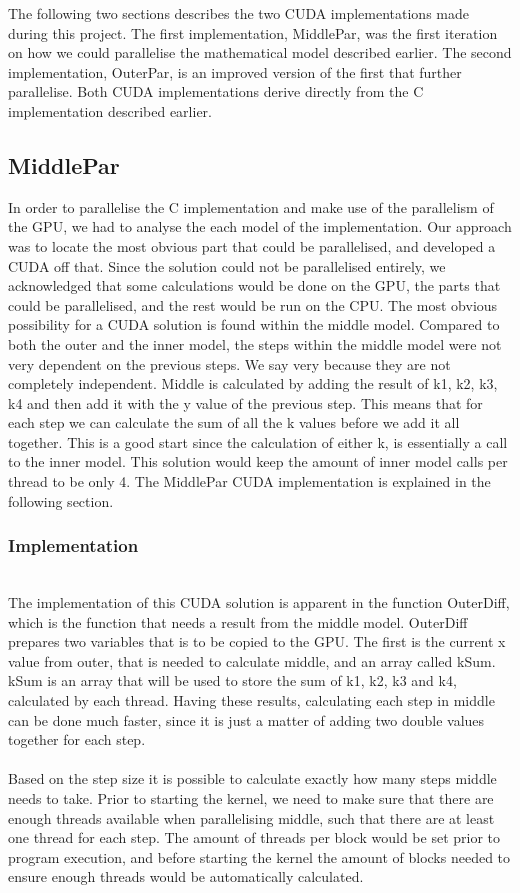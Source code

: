 The following two sections describes the two CUDA implementations made during this project. The first implementation, MiddlePar, was the first iteration on how we could parallelise the mathematical model described earlier. The second implementation, OuterPar, is an improved version of the first that further parallelise. Both CUDA implementations derive directly from the C implementation described earlier.

\subsection{MiddlePar}
In order to parallelise the C implementation and make use of the parallelism of the GPU, we had to analyse the each model of the implementation. Our approach was to locate the most obvious part that could be parallelised, and developed a CUDA off that. Since the solution could not be parallelised entirely, we acknowledged that some calculations would be done on the GPU, the parts that could be parallelised, and the rest would be run on the CPU. The most obvious possibility for a CUDA solution is found within the middle model. Compared to both the outer and the inner model, the steps within the middle model were not very dependent on the previous steps. We say very because they are not completely independent. Middle is calculated by adding the result of k1, k2, k3, k4 and then add it with the y value of the previous step. This means that for each step we can calculate the sum of all the k values before we add it all together. This is a good start since the calculation of either k, is essentially a call to the inner model. This solution would keep the amount of inner model calls per thread to be only 4. The MiddlePar CUDA implementation is explained in the following section.

\subsubsection{Implementation} \hfill\\
The implementation of this CUDA solution is apparent in the function OuterDiff, which is the function that needs a result from the middle model. OuterDiff prepares two variables that is to be copied to the GPU. The first is the current x value from outer, that is needed to calculate middle, and an array called kSum. kSum is an array that will be used to store the sum of k1, k2, k3 and k4, calculated by each thread. Having these results, calculating each step in middle can be done much faster, since it is just a matter of adding two double values together for each step. \\ \\
Based on the step size it is possible to calculate exactly how many steps middle needs to take. Prior to starting the kernel, we need to make sure that there are enough threads available when parallelising middle, such that there are at least one thread for each step. The amount of threads per block would be set prior to program execution, and before starting the kernel the amount of blocks needed to ensure enough threads would be automatically calculated.\\

